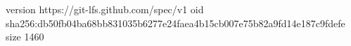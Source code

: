 version https://git-lfs.github.com/spec/v1
oid sha256:db50fb04ba68bb831035b6277e24faea4b15cb007e75b82a9fd14e187c9fdefe
size 1460
